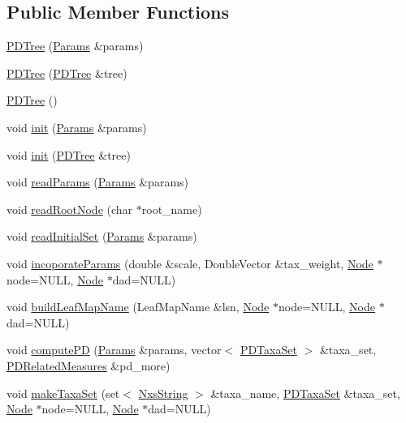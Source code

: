 \subsection*{Public Member Functions}
\begin{DoxyCompactItemize}
\item 
\hyperlink{classPDTree_a3561a63dd0ff1df68e0705bd3a734802}{PDTree} (\hyperlink{structParams}{Params} \&params)
\item 
\hyperlink{classPDTree_aabcb230432131fcf1a626497582136b7}{PDTree} (\hyperlink{classPDTree}{PDTree} \&tree)
\item 
\hyperlink{classPDTree_afbd93cea8f1f5d76f1b5f5130bf0933f}{PDTree} ()
\item 
void \hyperlink{classPDTree_ac90fad3aa9dd0dd64594a15135c8685a}{init} (\hyperlink{structParams}{Params} \&params)
\item 
void \hyperlink{classPDTree_a423ef933e7940c5c745e27898a394bfc}{init} (\hyperlink{classPDTree}{PDTree} \&tree)
\item 
void \hyperlink{classPDTree_a912f332d0f5b13f4bc6820196af53875}{readParams} (\hyperlink{structParams}{Params} \&params)
\item 
void \hyperlink{classPDTree_a5153f2fadfa0f9a60e1289127afa31b3}{readRootNode} (char $\ast$root\_\-name)
\item 
void \hyperlink{classPDTree_a74fae123a26ba1061e5bba39f2b88525}{readInitialSet} (\hyperlink{structParams}{Params} \&params)
\item 
void \hyperlink{classPDTree_a9a4be8dc6c13aa51a188f17d04a8c492}{incoporateParams} (double \&scale, DoubleVector \&tax\_\-weight, \hyperlink{classNode}{Node} $\ast$node=NULL, \hyperlink{classNode}{Node} $\ast$dad=NULL)
\item 
void \hyperlink{classPDTree_ad309e7ef92c45dcad2e84bad0f216cb1}{buildLeafMapName} (LeafMapName \&lsn, \hyperlink{classNode}{Node} $\ast$node=NULL, \hyperlink{classNode}{Node} $\ast$dad=NULL)
\item 
void \hyperlink{classPDTree_af35a390cd0d1e7d9b24447d356f99ed1}{computePD} (\hyperlink{structParams}{Params} \&params, vector$<$ \hyperlink{classPDTaxaSet}{PDTaxaSet} $>$ \&taxa\_\-set, \hyperlink{structPDRelatedMeasures}{PDRelatedMeasures} \&pd\_\-more)
\item 
void \hyperlink{classPDTree_aff9a948210c8eaeab55b820fb908c3c1}{makeTaxaSet} (set$<$ \hyperlink{classNxsString}{NxsString} $>$ \&taxa\_\-name, \hyperlink{classPDTaxaSet}{PDTaxaSet} \&taxa\_\-set, \hyperlink{classNode}{Node} $\ast$node=NULL, \hyperlink{classNode}{Node} $\ast$dad=NULL)

\end{DoxyCompactItemize}

